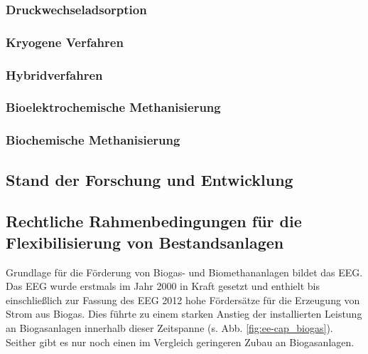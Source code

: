\subsubsection{Druckwechseladsorption}\label{chap:PSA}


\subsubsection{Kryogene Verfahren}\label{chap:kryo}



\subsubsection{Hybridverfahren}\label{chap:hybrid} 


\subsubsection{Bioelektrochemische Methanisierung}\label{chap:bioelectr}


\subsubsection{Biochemische Methanisierung}\label{chap:biochem} 





\subsection{Stand der Forschung und Entwicklung}


\subsection{Rechtliche Rahmenbedingungen für die Flexibilisierung von Bestandsanlagen}\label{chap:law_theo}

Grundlage für die Förderung von Biogas- und Biomethananlagen bildet das \gls{EEG}. Das \gls{EEG} wurde erstmals im Jahr 2000 in Kraft gesetzt und enthielt bis einschließlich zur Fassung des \gls{EEG} \SI{2012}{\relax} hohe Fördersätze für die Erzeugung von Strom aus Biogas. Dies führte zu einem starken Anstieg der installierten Leistung an Biogasanlagen innerhalb dieser Zeitspanne (s. Abb. \ref{fig:ee-cap_biogas}). Seither gibt es nur noch einen im Vergleich geringeren Zubau an Biogasanlagen. \parencite{DanielGromke2019}\smallskip

